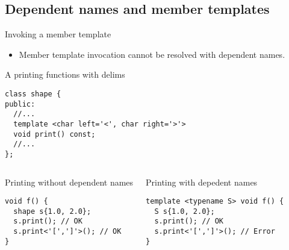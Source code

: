 \subsection{Dependent names and member templates}

\begin{frame}[t,fragile]{Invoking a member template}
\begin{itemize}
  \item Member template invocation cannot be resolved with dependent names.
\end{itemize}

\begin{block}{A printing functions with delims}
\begin{lstlisting}[basicstyle=\tiny]
class shape {
public:
  //...
  template <char left='<', char right='>'>
  void print() const;
  //...
};
\end{lstlisting}
\end{block}

\begin{columns}[T]

\begin{block}{Printing without dependent names}
\begin{lstlisting}
void f() {
  shape s{1.0, 2.0};
  s.print(); // OK
  s.print<'[',']'>(); // OK
}
\end{lstlisting}
\end{block}

\begin{block}{Printing with depedent names}
\begin{lstlisting}
template <typename S> void f() {
  S s{1.0, 2.0};
  s.print(); // OK
  s.print<'[',']'>(); // Error
}
\end{lstlisting}
\end{block}

\end{columns}
\end{frame}


